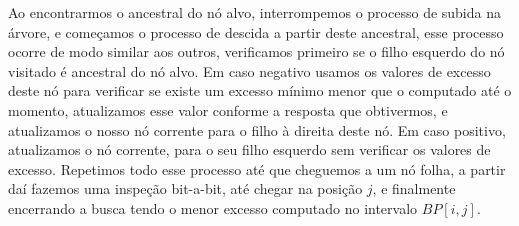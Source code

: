     Ao encontrarmos o ancestral do nó alvo, interrompemos o processo de subida na árvore, e começamos o processo de descida a partir deste ancestral,
     esse processo ocorre de modo similar aos outros,
    verificamos primeiro se o filho  esquerdo do nó visitado é ancestral do nó alvo. Em caso negativo usamos os valores de excesso deste nó 
    para verificar se existe um excesso mínimo menor que o computado até o momento,
    atualizamos esse valor conforme a resposta que obtivermos, e atualizamos o nosso nó corrente para o filho à direita deste nó. 
    Em caso positivo, atualizamos o nó corrente, para o seu filho esquerdo sem verificar os valores de excesso.
    Repetimos todo esse processo até que cheguemos a um nó folha, a partir daí fazemos uma inspeção bit-a-bit, até chegar na posição $j$, 
    e finalmente encerrando a busca tendo o menor excesso computado no intervalo $BP[i,j]$.


